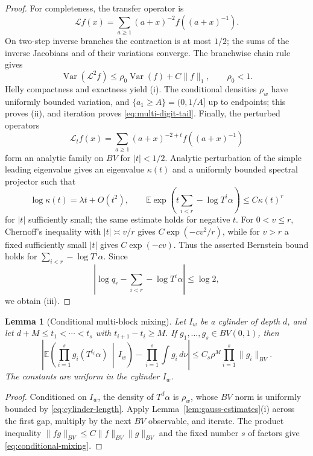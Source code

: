 \documentclass[11pt,a4paper]{amsart}
\newtheorem{lemma}[theorem]{Lemma}
\theoremstyle{definition}
\theoremstyle{remark}
\newcommand{\E}{\mathbb E}
\newcommand{\Var}{\operatorname{Var}}
\begin{document}
\begin{proof}
For completeness, the transfer operator is
\[
 \mathcal Lf(x)=\sum_{a\ge1}(a+x)^{-2}
 f\!\left((a+x)^{-1}\right).
\]
On two-step inverse branches the contraction is at most $1/2$; the sums of
the inverse Jacobians and of their variations converge.  The branchwise chain
rule gives
\[
 \Var(\mathcal L^2f)\le\rho_0\Var(f)+C\|f\|_1,
 \qquad \rho_0<1.
\]
Helly compactness and exactness yield (i).  The conditional densities
$\rho_w$ have uniformly bounded variation, and
$\{a_1\ge A\}=(0,1/A]$ up to endpoints; this proves (ii), and iteration proves
\eqref{eq:multi-digit-tail}.  Finally, the perturbed operators
\[
 \mathcal L_t f(x)=\sum_{a\ge1}(a+x)^{-2+t}
 f\!\left((a+x)^{-1}\right)
\]
form an analytic family on $BV$ for $|t|<1/2$.  Analytic perturbation of the
simple leading eigenvalue gives an eigenvalue $\kappa(t)$ and a uniformly
bounded spectral projector such that
\[
 \log\kappa(t)=\lambda t+O(t^2),
 \qquad
 \E\exp\!\left(t\sum_{i<r}-\log T^i\alpha\right)
 \le C\kappa(t)^r
\]
for $|t|$ sufficiently small; the same estimate holds for negative $t$.
For $0<v\le r$, Chernoff's inequality with $|t|\asymp v/r$ gives
$C\exp(-cv^2/r)$, while for $v>r$ a fixed sufficiently small $|t|$ gives
$C\exp(-cv)$.  Thus the asserted Bernstein bound holds for
$\sum_{i<r}-\log T^i\alpha$.
Since
\[
 \left|\log q_r-\sum_{i<r}-\log T^i\alpha\right|\le\log2,
\]
we obtain (iii).
\end{proof}

\begin{lemma}[Conditional multi-block mixing]\label{lem:conditional-mixing}
Let $I_w$ be a cylinder of depth $d$, and let
$d+M\le t_1<\cdots<t_s$ with $t_{i+1}-t_i\ge M$.  If
$g_1,\ldots,g_s\in BV(0,1)$, then
\begin{equation}\label{eq:conditional-mixing}
 \left|
 \E\left(\prod_{i=1}^s g_i(T^{t_i}\alpha)\,\middle|\,I_w\right)
 -\prod_{i=1}^s\int g_i\,d\nu
 \right|
 \le C_s\rho^M\prod_{i=1}^s\|g_i\|_{BV}.
\end{equation}
The constants are uniform in the cylinder $I_w$.
\end{lemma}

\begin{proof}
Conditioned on $I_w$, the density of $T^d\alpha$ is $\rho_w$, whose $BV$
norm is uniformly bounded by \eqref{eq:cylinder-length}.  Apply
Lemma~\ref{lem:gauss-estimates}(i) across the first gap, multiply by the next
$BV$ observable, and iterate.  The product inequality
$\|fg\|_{BV}\le C\|f\|_{BV}\|g\|_{BV}$ and the fixed number $s$ of factors
give \eqref{eq:conditional-mixing}.
\end{proof}
\end{document}
